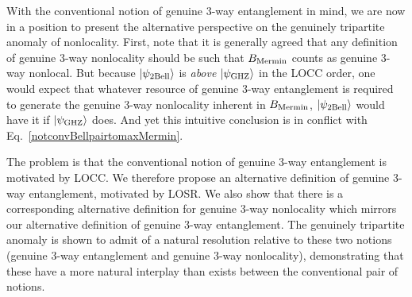 \documentclass[prx,11pt,letterpaper,twocolumn,accepted=2023-11-27]{quantumarticle}
\newcommand{\ket}[1]{\left| #1 \right>}
\theoremstyle{plain}
\theoremstyle{definition}
\begin{document}
With the conventional notion of genuine 3-way entanglement in mind,
we are now in a position to present the alternative perspective on the genuinely tripartite anomaly of nonlocality.
First, note that it is generally agreed that any definition of genuine 3-way nonlocality should be such that $B_{\rm Mermin}$  counts as genuine 3-way nonlocal.
But because
 $\ket{\psi_{\rm 2Bell}}$ is {\em above} $\ket{\psi_{\rm GHZ}}$ in the LOCC order, one would expect that whatever resource of genuine 3-way entanglement is required to generate the genuine 3-way nonlocality inherent in $B_{\rm Mermin}$, $\ket{\psi_{\rm 2Bell}}$ would have it if $\ket{\psi_{\rm GHZ}}$ does.  And yet this intuitive conclusion is in conflict with
 Eq.~\eqref{notconvBellpairtomaxMermin}.  


The problem is that the conventional notion of genuine 3-way entanglement is motivated by LOCC.
 We therefore propose an alternative definition of genuine 3-way entanglement, motivated by LOSR.  We also show that there is a corresponding alternative definition for genuine 3-way nonlocality which mirrors our alternative definition of genuine 3-way entanglement.  The genuinely tripartite anomaly is shown to admit of a natural resolution relative to these two notions (genuine 3-way entanglement and genuine 3-way nonlocality), demonstrating that these have a more natural interplay than exists between the conventional pair of notions.
\end{document}
